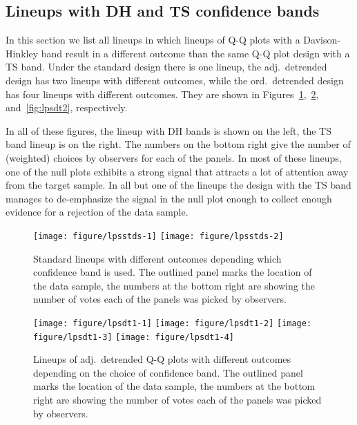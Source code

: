 \documentclass[12pt]{article}\usepackage[]{graphicx}\usepackage[]{color}
\newenvironment{knitrout}{}{} %
\begin{document}
\begin{appendix}
\section{Lineups with DH and TS confidence bands}\label{sec:lplist}

%
In this section we list all lineups in which lineups of Q-Q plots with a Davison-Hinkley band result in a different outcome than the same Q-Q plot design with a TS band. 
Under the standard design there is one lineup, the adj.\ detrended  design has two lineups with different outcomes, while the ord.\ detrended design has four lineups with different outcomes. They are shown in Figures~\ref{fig:lpsstds},~\ref{fig:lpsdt1}, and~\ref{fig:lpsdt2}, respectively. 

In all of these figures, the lineup with DH bands is shown on the left, the TS band lineup is on the right. The numbers on the bottom right give the number of (weighted) choices by observers for each of the panels. In most of these lineups, one of the null plots exhibits a strong signal that attracts a lot of attention away from the target sample. In all but one of the lineups the design with the TS band manages to de-emphasize the signal in the null plot enough to collect enough evidence for a rejection of the data sample.
\begin{figure}
\centering
\begin{knitrout}
\color{fgcolor}
\texttt{[image: figure/lpsstds-1]} 
\texttt{[image: figure/lpsstds-2]} 

\end{knitrout}
\caption{\label{fig:lpsstds} Standard lineups with different outcomes depending which confidence band is used. The outlined panel marks the location of the data sample, the numbers at the bottom right are showing the number of votes each of the panels was picked by observers.  }
\end{figure}
\afterpage{\clearpage}


\begin{figure}
\centering
\begin{knitrout}
\color{fgcolor}
\texttt{[image: figure/lpsdt1-1]} 
\texttt{[image: figure/lpsdt1-2]} 
\texttt{[image: figure/lpsdt1-3]} 
\texttt{[image: figure/lpsdt1-4]} 

\end{knitrout}
\caption{\label{fig:lpsdt1} Lineups of adj.\ detrended Q-Q plots with different outcomes depending on the choice of confidence band. The outlined panel marks the location of the data sample, the numbers at the bottom right are showing the number of votes each of the panels was picked by observers.  }
\end{figure}
\afterpage{\clearpage}




\end{appendix}
\end{document}
